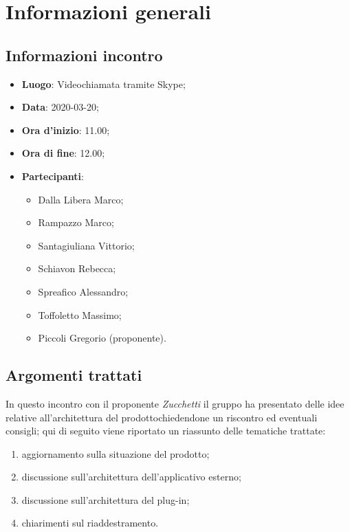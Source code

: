 \section{Informazioni generali}
    \subsection{Informazioni incontro}
        \begin{itemize}
            \item \textbf{Luogo}: Videochiamata tramite Skype;
            \item \textbf{Data}: 2020-03-20;
            \item \textbf{Ora d'inizio}: 11.00;
            \item \textbf{Ora di fine}: 12.00;
            \item \textbf{Partecipanti}: 
            \begin{itemize}
                \item Dalla Libera Marco;
                \item Rampazzo Marco;
                \item Santagiuliana Vittorio;
                \item Schiavon Rebecca;
                \item Spreafico Alessandro;
                \item Toffoletto Massimo;
                \item Piccoli Gregorio (proponente).
            \end{itemize}
        \end{itemize}
    \subsection{Argomenti trattati}
        In questo incontro con il proponente \textit{Zucchetti} il gruppo ha presentato delle idee relative all'architettura del prodotto\glosp chiedendone un riscontro ed eventuali consigli; qui di seguito viene riportato un riassunto delle tematiche trattate:
        \begin{enumerate}
            \item aggiornamento sulla situazione del prodotto\glo;
            \item discussione sull'architettura dell'applicativo esterno;
            \item discussione sull'architettura del plug-in;
            \item chiarimenti sul riaddestramento.
        \end{enumerate}
